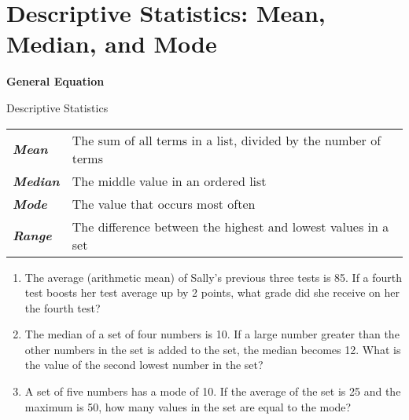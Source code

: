 \section{Descriptive Statistics: Mean, Median, and Mode}

\textbf{General Equation}

\bigskip
\begin{equationbox}{Descriptive Statistics}
\begin{center}
\renewcommand{\arraystretch}{1.5}
\begin{tabular}{>{\itshape\bfseries}ll}
Mean & The sum of all terms in a list, divided by the number of terms\\
Median & The middle value in an ordered list\\
Mode & The value that occurs most often\\
Range & The difference between the highest and lowest values in a set
\end{tabular}
\end{center}
\end{equationbox}

\bigskip
\begin{enumerate}[labelindent=*,style=multiline,leftmargin=*,label=\textbf{Example \arabic*:}]
\item The average (arithmetic mean) of Sally's previous three tests is 85. If a fourth test boosts her test average up by 2 points, what grade did she receive on her the fourth test?
\vfill\item The median of a set of four numbers is 10. If a large number greater than the other numbers in the set is added to the set, the median becomes 12. What is the value of the second lowest number in the set?
\vfill\item A set of five numbers has a mode of 10. If the average of the set is 25 and the maximum is 50, how many values in the set are equal to the mode?
\end{enumerate}

